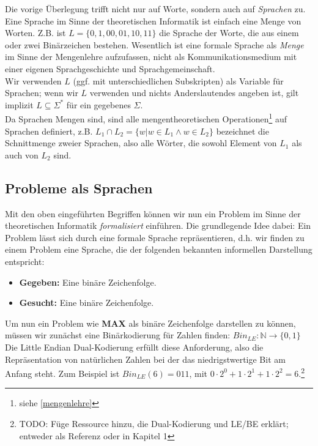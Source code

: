 {Die vorige Überlegung trifft nicht nur auf Worte, sondern auch auf \emph{Sprachen} zu.
Eine Sprache im Sinne der theoretischen Informatik ist einfach eine Menge von Worten.
Z.B. ist $L = \{0, 1, 00, 01, 10, 11 \}$ die Sprache der Worte,
die aus einem oder zwei Binärzeichen bestehen.
Wesentlich ist eine formale Sprache als \emph{Menge} im Sinne der Mengenlehre aufzufassen, 
nicht als Kommunikationsmedium mit einer eigenen Sprachgeschichte und Sprachgemeinschaft.\\

\noindent
Wir verwenden $L$ (ggf. mit unterschiedlichen Subskripten) als Variable für Sprachen;
wenn wir $L$ verwenden und nichts Anderslautendes angeben ist,
gilt implizit $L \subseteq \Sigma^*$ für ein gegebenes $\Sigma$.\\

\noindent
Da Sprachen Mengen sind,
sind alle mengentheoretischen Operationen\footnote{siehe \autoref{mengenlehre}}
auf Sprachen definiert,
z.B. $L_1 \cap L_2 = \{w | w \in L_1 \wedge w \in L_2\}$
bezeichnet die Schnittmenge zweier Sprachen, also alle Wörter,
die sowohl Element von $L_1$ als auch von $L_2$ sind.

\subsection{Probleme als Sprachen}
Mit den oben eingeführten Begriffen können
wir nun ein Problem im Sinne der theoretischen Informatik
\emph{formalisiert} einführen.
Die grundlegende Idee dabei: Ein Problem lässt sich durch eine formale Sprache repräsentieren,
d.h. wir finden zu einem Problem eine Sprache, die der folgenden bekannten informellen
Darstellung entspricht:
\begin{itemize}
    \item \textbf{Gegeben:} Eine binäre Zeichenfolge. 
    \item \textbf{Gesucht:} Eine binäre Zeichenfolge.
\end{itemize}
Um nun ein Problem wie \textbf{MAX} als binäre Zeichenfolge darstellen zu können,
müssen wir zunächst eine Binärkodierung für Zahlen finden:
$Bin_{LE}: \mathbb{N} \rightarrow \{0,1\}$
Die Little Endian Dual-Kodierung erfüllt diese Anforderung,
also die Repräsentation von natürlichen Zahlen bei der
das niedrigstwertige Bit am Anfang steht.
Zum Beispiel ist $Bin_{LE}(6) = 011$, mit 
$
0 \cdot 2^0
+ 1 \cdot 2^1
+ 1 \cdot 2^2
= 6
$.\footnote{TODO: Füge Ressource hinzu, die Dual-Kodierung und LE/BE erklärt;
entweder als Referenz oder in Kapitel 1}

}
